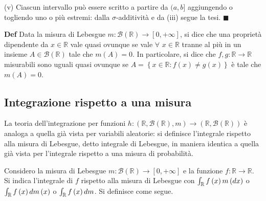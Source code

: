 \documentclass{article}
\begin{document}
(v) Ciascun intervallo pu\`{o} essere scritto a partire da $(a,b]$
aggiungendo o togliendo uno o pi\`{u} estremi: dalla $\sigma $-additivit\`{a}
e da (iii) segue la tesi. $\blacksquare $

\textbf{Def} Data la misura di Lebesgue $m:\mathcal{B}\left( 
\mathbb{R}
\right) \rightarrow \left[ 0,+\infty \right] $, si dice che una propriet\`{a}
dipendente da $x\in 
\mathbb{R}
$ vale quasi ovunque se vale $\forall $ $x\in 
\mathbb{R}
$ tranne al pi\`{u} in un insieme $A\in \mathcal{B}\left( 
\mathbb{R}
\right) $ tale che $m\left( A\right) =0$. In particolare, si dice che $f,g:%
\mathbb{R}
\rightarrow 
\mathbb{R}
$ misurabili sono uguali quasi ovunque se $A=\left\{ x\in 
\mathbb{R}
:f\left( x\right) \neq g\left( x\right) \right\} $ \`{e} tale che $m\left(
A\right) =0$.

\subsection{Integrazione rispetto a una misura}

La teoria dell'integrazione per funzioni $h:\left( 
\mathbb{R}
,\mathcal{B}\left( 
\mathbb{R}
\right) ,m\right) \rightarrow \left( 
\mathbb{R}
,\mathcal{B}\left( 
\mathbb{R}
\right) \right) $ \`{e} analoga a quella gi\`{a} vista per variabili
aleatorie: si definisce l'integrale rispetto alla misura di Lebesgue, detto integrale di Lebesgue, in maniera identica a quella già vista per l'integrale rispetto a una misura di probabilità. 

Considero la misura di Lebesgue $m:\mathcal{B}\left( 
\mathbb{R}
\right) \rightarrow \left[ 0,+\infty \right] $ e la funzione $f:%
\mathbb{R}
\rightarrow 
\mathbb{R}
$. Si indica l'integrale di $f$ rispetto alla misura di
Lebesgue con $\int_{%
\mathbb{R}
}f\left( x\right) m\left( dx\right) $ o $\int_{%
\mathbb{R}
}f\left( x\right) dm\left( x\right) $ o$\ \int_{%
\mathbb{R}
}f\left( x\right) dm$. Si definisce come segue.
\end{document}
